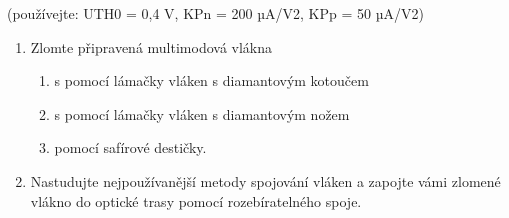 (používejte: UTH0 = 0,4 V, KPn = 200 µA/V2, KPp = 50 µA/V2)

\begin{enumerate}
    \item Zlomte připravená multimodová vlákna
    \begin{enumerate}
        \renewcommand{\labelenumi}{\alph{enumi})}
        \item s pomocí lámačky vláken s diamantovým kotoučem
        \item s pomocí lámačky vláken s diamantovým nožem
        \item pomocí safírové destičky.
    \end{enumerate}
    \item Nastudujte nejpoužívanější metody spojování vláken a zapojte vámi zlomené vlákno do optické trasy pomocí rozebíratelného spoje.    
\end{enumerate}
